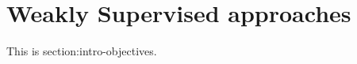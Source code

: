 \section{Weakly Supervised approaches}
\label{section:rel-weakly}

This is section:intro-objectives.
